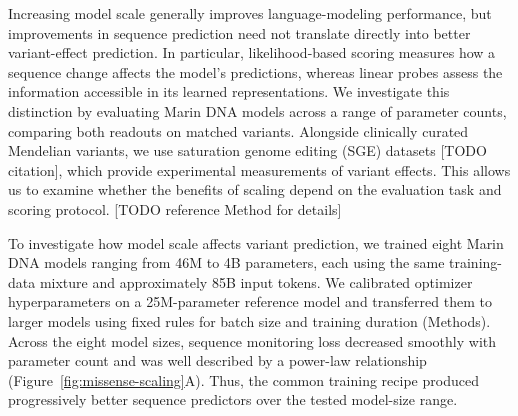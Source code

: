 \documentclass[a4paper,num-refs]{oup-contemporary}
\begin{document}
Increasing model scale generally improves language-modeling performance,
but improvements in sequence prediction need not translate directly
into better variant-effect prediction. In particular, likelihood-based
scoring measures how a sequence change affects the model's predictions,
whereas linear probes assess the information accessible in its learned
representations. We investigate this distinction by evaluating Marin DNA
models across a range of parameter counts, comparing both readouts on
matched variants. Alongside clinically curated Mendelian variants, we
use saturation genome editing (SGE) datasets [TODO citation],
which provide experimental
measurements of variant effects. This allows us to examine whether the
benefits of scaling depend on the evaluation task and scoring protocol.
[TODO reference Method for details]

To investigate how model scale affects variant prediction, we trained
eight Marin DNA models ranging from 46M to 4B parameters, each using
the same training-data mixture and approximately 85B input tokens.
We calibrated optimizer hyperparameters on a 25M-parameter reference
model and transferred them to larger models using fixed rules for
batch size and training duration (Methods).
Across the eight model sizes, sequence monitoring loss decreased
smoothly with parameter count and was well described by a power-law
relationship (Figure~\ref{fig:missense-scaling}A).
Thus, the common training recipe produced progressively better
sequence predictors over the tested model-size range.
\end{document}
